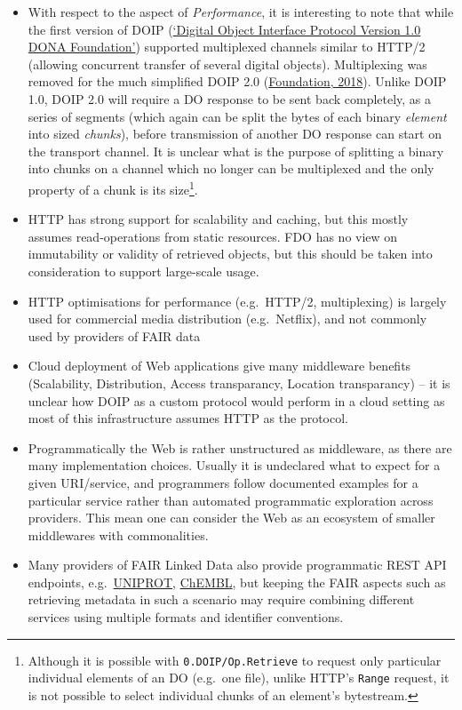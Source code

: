\begin{itemize}
\tightlist
\item
  With respect to the aspect of \emph{Performance}, it is interesting to note that while the first version of DOIP (\protect\hyperlink{ref-16uB3jxpa}{{`Digital Object Interface Protocol Version 1.0 \textbar{} DONA Foundation'}}) supported multiplexed channels similar to HTTP/2 (allowing concurrent transfer of several digital objects). Multiplexing was removed for the much simplified DOIP 2.0 (\protect\hyperlink{ref-13TcbsZF6}{Foundation, 2018}). Unlike DOIP 1.0, DOIP 2.0 will require a DO response to be sent back completely, as a series of segments (which again can be split the bytes of each binary \emph{element} into sized \emph{chunks}), before transmission of another DO response can start on the transport channel. It is unclear what is the purpose of splitting a binary into chunks on a channel which no longer can be multiplexed and the only property of a chunk is its size\footnote{Although it is possible with \texttt{0.DOIP/Op.Retrieve} to request only particular individual elements of an DO (e.g.~one file), unlike HTTP's \texttt{Range} request, it is not possible to select individual chunks of an element's bytestream.}.
\item
  HTTP has strong support for scalability and caching, but this mostly assumes read-operations from static resources. FDO has no view on immutability or validity of retrieved objects, but this should be taken into consideration to support large-scale usage.
\item
  HTTP optimisations for performance (e.g.~HTTP/2, multiplexing) is largely used for commercial media distribution (e.g.~Netflix), and not commonly used by providers of FAIR data
\item
  Cloud deployment of Web applications give many middleware benefits (Scalability, Distribution, Access transparancy, Location transparancy) -- it is unclear how DOIP as a custom protocol would perform in a cloud setting as most of this infrastructure assumes HTTP as the protocol.
\item
  Programmatically the Web is rather unstructured as middleware, as there are many implementation choices. Usually it is undeclared what to expect for a given URI/service, and programmers follow documented examples for a particular service rather than automated programmatic exploration across providers. This mean one can consider the Web as an ecosystem of smaller middlewares with commonalities.
\item
  Many providers of FAIR Linked Data also provide programmatic REST API endpoints, e.g.~\href{https://www.uniprot.org/help/programmatic_access}{UNIPROT}, \href{https://chembl.gitbook.io/chembl-interface-documentation/web-services}{ChEMBL}, but keeping the FAIR aspects such as retrieving metadata in such a scenario may require combining different services using multiple formats and identifier conventions.
\end{itemize}

